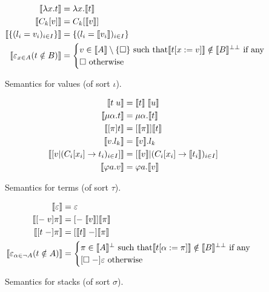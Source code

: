 \begin{figure}
  \begin{align*}
    \llbracket \lambda x.t \rrbracket
      &= \lambda x.\llbracket t \rrbracket\\
    \llbracket C_k[v] \rrbracket
      &= C_k[\llbracket v \rrbracket]\\
    \llbracket \{(l_i=v_i)_{i \in I}\} \rrbracket
      &= \{(l_i = \llbracket v_i \rrbracket)_{i \in I}\}\\
    \llbracket \varepsilon_{x \in A}(t \notin B) \rrbracket
      &= \begin{cases}
           v \in \llbracket A \rrbracket \setminus \{\square\}
             \text{ such that} \llbracket t[x := v] \rrbracket \notin
             \llbracket B \rrbracket^{\bot\bot} \text{ if any}\\
           \square \text { otherwise}
         \end{cases}
  \end{align*}
  \caption{Semantics for values (of sort $\iota$).}
  \label{semiota}
\end{figure}

\begin{figure}
  \begin{align*}
    \llbracket t\;u \rrbracket
      &= \llbracket t \rrbracket\; \llbracket u \rrbracket\\
    \llbracket \mu\alpha.t \rrbracket
      &= \mu \alpha.\llbracket t \rrbracket\\
    \llbracket [\pi]t \rrbracket
      &= [\llbracket \pi \rrbracket]\llbracket t \rrbracket\\
    \llbracket v.l_k \rrbracket
      &= \llbracket v \rrbracket.l_k\\
    \llbracket [v|(C_i[x_i] \to t_i)_{i \in I}] \rrbracket
      &= [\llbracket v \rrbracket | (C_i[x_i]
         \to \llbracket t_i \rrbracket)_{i \in I}]\\
    \llbracket \varphi a.v \rrbracket
      &= \varphi a.\llbracket v \rrbracket
  \end{align*}
  \caption{Semantics for terms (of sort $\tau$).}
  \label{semtau}
\end{figure}

\begin{figure}
  \begin{align*}
    \llbracket \varepsilon \rrbracket &= \varepsilon\\
    \llbracket [-\;v]\pi \rrbracket
      &= [-\;\llbracket v \rrbracket]\llbracket \pi \rrbracket\\
    \llbracket [t\;-]\pi \rrbracket
      &= [\llbracket t \rrbracket\;-]\llbracket \pi \rrbracket\\
    \llbracket \varepsilon_{\alpha \in \lnot A}(t \notin A) \rrbracket
      &= \begin{cases}
           \pi \in \llbracket A \rrbracket^\bot \text{ such that}
             \llbracket t[\alpha := \pi] \rrbracket \notin
             \llbracket B \rrbracket^{\bot\bot} \text{ if any}\\
           [\square\;-]\varepsilon \text { otherwise}
         \end{cases}
  \end{align*}
  \caption{Semantics for stacks (of sort $\sigma$).}
  \label{semsigma}
\end{figure}

